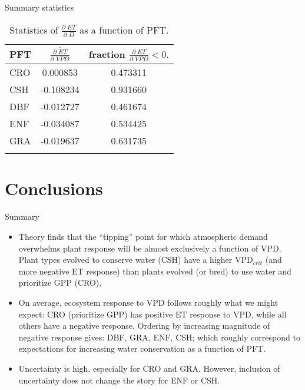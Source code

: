 \documentclass{beamer}
\begin{document}
   \begin{frame}{Summary statistics}
     \begin{table}
       \caption{Statistics of $\frac{\partial \; ET}{\partial \; D}$ as a function of PFT.}
       \centering
       \begin{tabular}{l c c}
         \hline
         PFT & $\overline{\frac{\partial \; ET}{\partial \; VPD}}$ & fraction $\frac{\partial \; ET}{\partial \; VPD} < 0.$ \\
         \hline
         CRO & 0.000853  & 0.473311\\
         CSH & -0.108234 & 0.931660\\
         DBF & -0.012727 & 0.461674\\
         ENF & -0.034087 & 0.534425\\
         GRA & -0.019637 & 0.631735\\
         \hline
         \multicolumn{2}{l}{}  
       \end{tabular}
     \end{table}
   \end{frame}
     
\section{Conclusions}
\begin{frame}{Summary}
  \begin{itemize}
  \item Theory finds that the ``tipping'' point for which atmospheric demand overwhelms plant response will be almost exclusively a function of VPD.  Plant types evolved to conserve water (CSH) have a higher VPD$_{crit}$ (and more negative ET response) than plants evolved (or bred) to use water and prioritize GPP (CRO).
  \item On average, ecosystem response to VPD follows roughly what we might expect: CRO (prioritize GPP) has positive ET response to VPD, while all others have a negative response. Ordering by increasing magnitude of negative response gives: DBF, GRA, ENF, CSH; which roughly correspond to expectations for increasing water conservation as a function of PFT.
  \item Uncertainty is high, especially for CRO and GRA. However, inclusion of uncertainty does not change the story for ENF or CSH.
  \end{itemize}
\end{frame}
  
\end{document}
